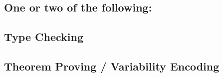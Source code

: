 
\subsection{One or two of the following:}

\subsection{Type Checking} %



\subsection{Theorem Proving / Variability Encoding}
